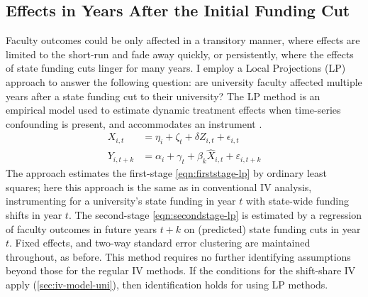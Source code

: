 \subsection{Effects in Years After the Initial Funding Cut}
\label{sec:local-projections}
Faculty outcomes could be only affected in a transitory manner, where effects are limited to the short-run and fade away quickly, or persistently, where the effects of state funding cuts linger for many years.
I employ a Local Projections (LP) approach to answer the following question: are university faculty affected multiple years after a state funding cut to their university?
The LP method is an empirical model used to estimate dynamic treatment effects when time-series confounding is present, and accommodates an instrument \citep{jorda2005,olea2021inference}.
\begin{align}
    \label{eqn:firststage-lp}
    X_{i,t}   &= \eta_i + \zeta_t + \delta Z_{i,t} + \epsilon_{i,t} \\
    \label{eqn:secondstage-lp}
    Y_{i,t+k} &= \alpha_i + \gamma_t + \beta_k \widehat X_{i,t} + \varepsilon_{i,t+k}
\end{align}
The approach estimates the first-stage \eqref{eqn:firststage-lp} by ordinary least squares; here this approach is the same as in conventional IV analysis, instrumenting for a university's state funding in year $t$ with state-wide funding shifts in year $t$.
The second-stage \eqref{eqn:secondstage-lp} is estimated by a regression of 
faculty outcomes in future years $t+k$ on (predicted) state funding cuts in year $t$.
Fixed effects, and two-way standard error clustering are maintained throughout, as before.
This method requires no further identifying assumptions beyond those for the regular IV methods.
If the conditions for the shift-share IV apply (\autoref{sec:iv-model-uni}), then identification holds for using LP methods.

